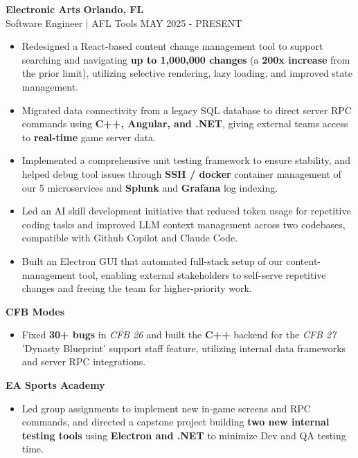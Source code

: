 \documentclass[10pt, letterpaper]{article}
\begin{document}
\noindent\textbf{Electronic Arts} \hfill \textbf{Orlando, FL} \\
Software Engineer $|$ AFL Tools \hfill MAY 2025 - PRESENT
\begin{itemize}[leftmargin=*, noitemsep, topsep=1pt, itemsep=1pt]
    \item Redesigned a React-based content change management tool to support searching and navigating \textbf{up to 1,000,000 changes} (a \textbf{200x increase} from the prior limit), utilizing selective rendering, lazy loading, and improved state management.
    \item Migrated data connectivity from a legacy SQL database to direct server RPC commands using \textbf{C++, Angular, and .NET}, giving external teams access to \textbf{real-time} game server data.
    \item Implemented a comprehensive unit testing framework to ensure stability, and helped debug tool issues through \textbf{SSH / docker} container management of our 5 microservices and \textbf{Splunk} and \textbf{Grafana} log indexing. 
    \item Led an AI skill development initiative that reduced token usage for repetitive coding tasks and improved LLM context management across two codebases, compatible with Github Copilot and Claude Code.
    \item Built an Electron GUI that automated full-stack setup of our content-management tool, enabling external stakeholders to self-serve repetitive changes and freeing the team for higher-priority work.
\end{itemize}

\vspace{1.5mm}
\noindent\textbf{CFB Modes}
\begin{itemize}[leftmargin=*, noitemsep, topsep=1pt]
    \item Fixed \textbf{30+ bugs} in \textit{CFB 26} and built the \textbf{C++} backend for the \textit{CFB 27} 'Dynasty Blueprint' support staff feature, utilizing internal data frameworks and server RPC integrations.
\end{itemize}

\vspace{1.5mm}
\noindent\textbf{EA Sports Academy}
\begin{itemize}[leftmargin=*, noitemsep, topsep=1pt]
    \item Led group assignments to implement new in-game screens and RPC commands, and directed a capstone project building \textbf{two new internal testing tools} using \textbf{Electron and .NET} to minimize Dev and QA testing time.
\end{itemize}
\end{document}
